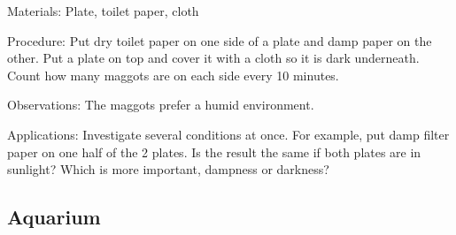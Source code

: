 \begin{multicols}{2}
\begin{description*}
\item[Materials:]{Plate, toilet paper, cloth}
\item[Procedure:]{Put dry toilet paper on one side of
a plate and damp paper on the
other. Put a plate on top and
cover it with a cloth so it is dark
underneath. Count how many
maggots are on each side every
10 minutes.}
\item[Observations:]{The maggots prefer a humid environment.}
\item[Applications:]{Investigate several conditions at
once. For example, put damp
filter paper on one half of the 2
plates. Is the result the same if
both plates are in sunlight? Which
is more important, dampness or
darkness?}
\end{description*}

%
%

\subsection{Aquarium} %


\end{multicols}
